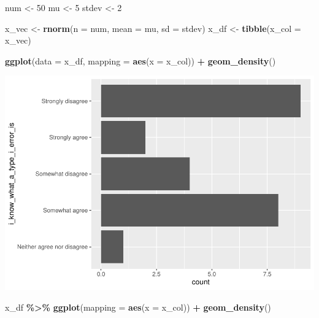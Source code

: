 \documentclass[
]{book}
\newenvironment{Shaded}{\begin{snugshade}}{\end{snugshade}}
\newcommand{\DataTypeTok}[1]{\textcolor[rgb]{0.13,0.29,0.53}{#1}}
\newcommand{\DecValTok}[1]{\textcolor[rgb]{0.00,0.00,0.81}{#1}}
\newcommand{\KeywordTok}[1]{\textcolor[rgb]{0.13,0.29,0.53}{\textbf{#1}}}
\newcommand{\NormalTok}[1]{#1}
\newcommand{\OperatorTok}[1]{\textcolor[rgb]{0.81,0.36,0.00}{\textbf{#1}}}
\newcommand{\StringTok}[1]{\textcolor[rgb]{0.31,0.60,0.02}{#1}}
\begin{document}
\begin{Shaded}
\begin{Highlighting}[]
\NormalTok{num \textless{}{-}}\StringTok{ }\DecValTok{50}
\NormalTok{mu \textless{}{-}}\StringTok{ }\DecValTok{5}
\NormalTok{stdev \textless{}{-}}\StringTok{ }\DecValTok{2}

\NormalTok{x\_vec \textless{}{-}}\StringTok{ }\KeywordTok{rnorm}\NormalTok{(}\DataTypeTok{n =}\NormalTok{ num, }\DataTypeTok{mean =}\NormalTok{ mu, }\DataTypeTok{sd =}\NormalTok{ stdev)}
\NormalTok{x\_df \textless{}{-}}\StringTok{ }\KeywordTok{tibble}\NormalTok{(}\DataTypeTok{x\_col =}\NormalTok{ x\_vec)}



\KeywordTok{ggplot}\NormalTok{(}\DataTypeTok{data =}\NormalTok{ x\_df, }\DataTypeTok{mapping =} \KeywordTok{aes}\NormalTok{(}\DataTypeTok{x =}\NormalTok{ x\_col)) }\OperatorTok{+}
\StringTok{  }\KeywordTok{geom\_density}\NormalTok{()}
\end{Highlighting}
\end{Shaded}

\includegraphics{test_course_notes_files/figure-latex/unnamed-chunk-13-1.pdf}

\begin{Shaded}
\begin{Highlighting}[]
\NormalTok{x\_df }\OperatorTok{\%\textgreater{}\%}
\StringTok{  }\KeywordTok{ggplot}\NormalTok{(}\DataTypeTok{mapping =} \KeywordTok{aes}\NormalTok{(}\DataTypeTok{x =}\NormalTok{ x\_col)) }\OperatorTok{+}
\StringTok{  }\KeywordTok{geom\_density}\NormalTok{()}
\end{Highlighting}
\end{Shaded}
\end{document}
